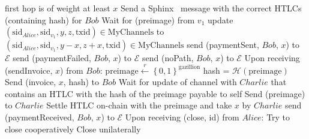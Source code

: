 \begin{algorithmic}[1]
{      first hop is of weight at least $x$}
        \State Send a Sphinx~\cite{sphinx} message with the correct HTLCs (containing
        hash) for $Bob$
        \State {}
        \State Wait for (preimage) from $v_1$
          \State update $\left(\mathrm{sid}_{Alice}, \mathrm{sid}_{v_1}, y, z,
          \mathrm{txid}\right) \in \mathrm{MyChannels}$ to $\left(\mathrm{sid}_{Alice},
          \mathrm{sid}_{v_1}, y - x, z + x, \mathrm{txid}\right) \in \mathrm{MyChannels}$
          \State send (paymentSent, $Bob$, $x$) to $\mathcal{E}$
        \Else
          \State send (paymentFailed, $Bob$, $x$) to $\mathcal{E}$
        \EndIf
      \Else
        \State send (noPath, $Bob$, $x$) to $\mathcal{E}$
      \EndIf
    \State
    \State Upon receiving (sendInvoice, $x$) from $Bob$:
      \State $\mathrm{preimage} \overset{r}{\leftarrow}
      \left\{0,1\right\}^{\mathrm{gazillion}}$
      \State hash = $\mathcal{H}\left(\mathrm{preimage}\right)$
      \State Send (invoice, $x$, hash) to $Bob$
      \State Wait for update of channel with $Charlie$ that contains an HTLC with the hash
      of the preimage payable to self
      \State Send (preimage) to $Charlie$
        \State Settle HTLC on-chain with the preimage and take $x$ by $Charlie$
      \EndIf
      \State send (paymentReceived, $Bob$, $x$) to $\mathcal{E}$
    \State
    \State Upon receiving (close, id) from $Alice$:
        \State Try to close cooperatively 
         
          \State Close unilaterally 
        \EndIf
      \EndIf
  \end{algorithmic}
\hrulefill
